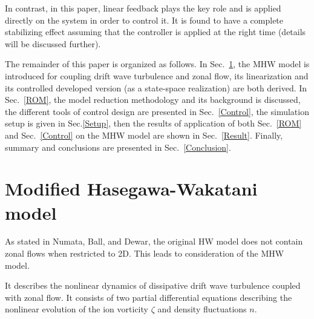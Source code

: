 \documentclass[12pt,lot, lof]{puthesis}
\begin{document}
In contrast, in this paper, linear feedback plays the key role and is applied directly on the system in order to control it.
It is found to have a complete stabilizing effect assuming that the controller is applied at the right time (details will be discussed further).

The remainder of this paper is organized as follows. In Sec.~\ref{MHW}, the MHW model is introduced for coupling drift wave turbulence and zonal flow, its linearization and its controlled developed version (as a state-space realization) are both derived. In Sec.~\ref{ROM}, the model reduction methodology and its background is discussed, the different tools of control design are presented in Sec.~\ref{Control}, the simulation setup is given in Sec.\ref{Setup}, then the results of application of both Sec.~\ref{ROM} and Sec.~\ref{Control} on the MHW model are shown in Sec.~\ref{Result}. Finally, summary and conclusions are presented in Sec.~\ref{Conclusion}.


 \section{Modified Hasegawa-Wakatani model}
 \label{MHW}
 
 As stated in Numata, Ball, and Dewar, \cite{Numata}  the original HW model does not contain zonal flows when restricted to 2D. This leads to consideration of the MHW model.
 
It describes the nonlinear dynamics of dissipative drift wave turbulence coupled with zonal flow. It consists of two partial differential equations describing the nonlinear evolution of the ion vorticity $\zeta$ and density fluctuations $n$.
\end{document}
